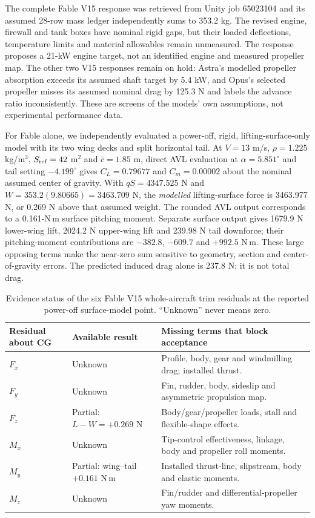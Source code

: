 \documentclass[11pt,a4paper]{article}
\begin{document}
The complete Fable V15 response was retrieved from Unity job 65023104 and
its assumed 28-row mass ledger independently sums to 353.2 kg. The revised
engine, firewall and tank boxes have nominal rigid gaps, but their loaded
deflections, temperature limits and material allowables remain unmeasured.
The response proposes a 21-kW engine target, not an identified engine and
measured propeller map. The other two V15 responses remain on hold: Astra's
modelled propeller absorption exceeds its assumed shaft target by 5.4 kW,
and Opus's selected propeller misses its assumed nominal drag by 125.3 N
and labels the advance ratio inconsistently. These are screens of the
models' own assumptions, not experimental performance data.

For Fable alone, we independently evaluated a power-off, rigid,
lifting-surface-only model with its two wing decks and split horizontal
tail. At $V=13$ m/s, $\rho=1.225$ kg/m$^3$, $S_{\rm ref}=42$ m$^2$ and
$\bar c=1.85$ m, direct AVL evaluation at $\alpha=5.851^\circ$ and tail
setting $-4.199^\circ$ gives $C_L=0.79677$ and $C_m=0.00002$ about the
nominal assumed center of gravity. With $qS=4347.525$ N and
$W=353.2(9.80665)=3463.709$ N, the \emph{modelled} lifting-surface force is
3463.977 N, or 0.269 N above that assumed weight. The rounded AVL output
corresponds to a 0.161-N\,m surface pitching moment. Separate surface
output gives 1679.9 N lower-wing lift, 2024.2 N upper-wing lift and
239.98 N tail downforce; their pitching-moment contributions are
$-382.8$, $-609.7$ and $+992.5$ N\,m. These large opposing terms make
the near-zero sum sensitive to geometry, section and center-of-gravity
errors. The predicted induced drag alone is 237.8 N; it is not total drag.

\begin{table}[p]
\centering\small
\caption{Evidence status of the six Fable V15 whole-aircraft trim residuals at the reported power-off surface-model point. ``Unknown'' never means zero.}
\label{tab:v15-fable-six-axis}
\begin{tabularx}{\linewidth}{@{}p{.16\linewidth}p{.24\linewidth}X@{}}
\toprule
Residual about CG & Available result & Missing terms that block acceptance\\
\midrule
$F_x$ & Unknown & Profile, body, gear and windmilling drag; installed thrust.\\
$F_y$ & Unknown & Fin, rudder, body, sideslip and asymmetric propulsion map.\\
$F_z$ & Partial: $L-W=+0.269$ N & Body/gear/propeller loads, stall and flexible-shape effects.\\
$M_x$ & Unknown & Tip-control effectiveness, linkage, body and propeller roll moments.\\
$M_y$ & Partial: wing--tail $+0.161$ N\,m & Installed thrust-line, slipstream, body and elastic moments.\\
$M_z$ & Unknown & Fin/rudder and differential-propeller yaw moments.\\
\bottomrule
\end{tabularx}
\end{table}
\end{document}
